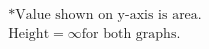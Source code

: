\documentclass[preview]{standalone}
\begin{document}
\begin{align*}
* \textrm{Value shown on y-axis is area.} \\ \textrm{Height}=\infty \textrm{for both graphs.}
\end{align*}
\end{document}

